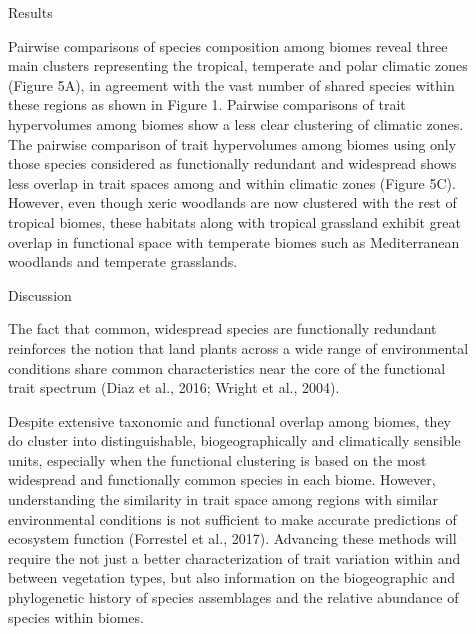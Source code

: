 \documentclass[final]{beamer}
\newlength{\sepwid}
\newlength{\onecolwid}
\newlength{\twocolwid}
\begin{document}
\begin{frame}[t]
\begin{columns}[t]
\begin{column}{\twocolwid}
\begin{alertblock}{Results}
\begin{multicols}{2}
Pairwise comparisons of species composition among biomes reveal three main clusters representing the tropical, temperate and polar climatic zones (Figure 5A), in agreement with the vast number of shared species within these regions as shown in Figure 1. Pairwise comparisons of trait hypervolumes among biomes show a less clear clustering of climatic zones. The pairwise comparison of trait hypervolumes among biomes using only those species considered as functionally redundant and widespread shows less overlap in trait spaces among and within climatic zones (Figure 5C). However, even though xeric woodlands are now clustered with the rest of tropical biomes, these habitats along with tropical grassland exhibit great overlap in functional space with temperate biomes such as Mediterranean woodlands and temperate grasslands. 

\end{multicols}
\end{alertblock}



			\begin{alertblock}{Discussion}
			
The fact that common, widespread species are functionally redundant reinforces the notion that land plants across a wide range of environmental conditions share common characteristics near the core of the functional trait spectrum (Diaz et al., 2016; Wright et al., 2004). 

Despite extensive taxonomic and functional overlap among biomes, they do cluster into distinguishable, biogeographically and climatically sensible units, especially when the functional clustering is based on the most widespread and functionally common species in each biome. However, understanding the similarity in trait space among regions with similar environmental conditions is not sufficient to make accurate predictions of ecosystem function (Forrestel et al., 2017). Advancing these methods will require the not just a better characterization of trait variation within and between vegetation types, but also information on the biogeographic and phylogenetic history of species assemblages and the relative abundance of species within biomes.

      		\end{alertblock}

 \end{column}



  \begin{column}{\sepwid}\end{column}			%
  \begin{column}{\onecolwid}




\end{column}
\end{columns}
\end{frame}
\end{document}
